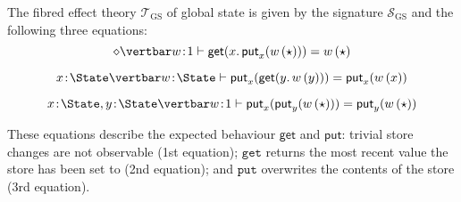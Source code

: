 \pagebreak

\begin{example}
\label{ex:fibtheoryofglobalstate}
The fibred effect theory $\mathcal{T}_{\text{GS}}$ of global state is given by the signature $\mathcal{S}_{\text{GS}}$ and the following three equations:
\[
{\diamond \vertbar w \!:\! 1} \vdash \mathsf{get}(x .\, \mathsf{put}_x(w\, (\star))) = w\, (\star)
\]

\[
{x \!:\! \State \vertbar w \!:\! \State} \vdash \mathsf{put}_x(\mathsf{get}(y .\, w\, (y))) = \mathsf{put}_x(w\, (x))
\vspace{0.15cm}
\]

\[
{x \!:\! \State, y \!:\! \State \vertbar w \!:\! 1} \vdash \mathsf{put}_x(\mathsf{put}_y(w\, (\star))) = \mathsf{put}_y(w\, (\star))
\]

These equations describe the expected behaviour $\mathsf{get}$ and $\mathsf{put}$: trivial store changes are not observable (1st equation); $\mathtt{get}$ returns the most recent value the store has been set to (2nd equation); and $\mathtt{put}$ overwrites the contents of the store (3rd equation).
\end{example}

